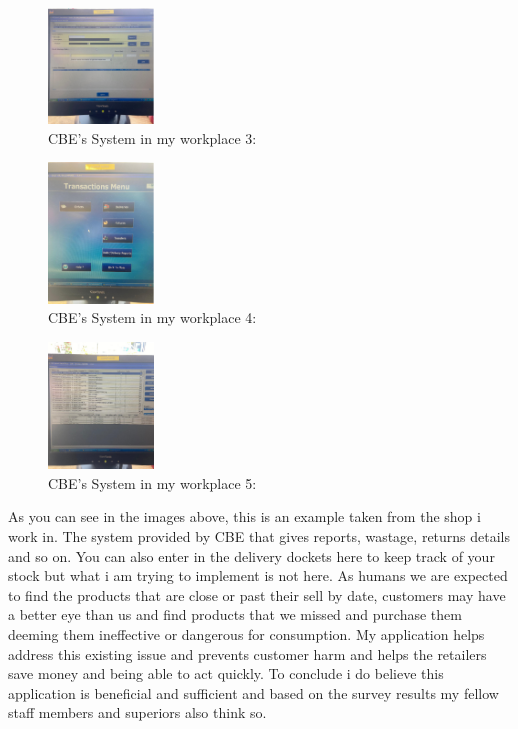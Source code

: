 \begin{figure}[h!]
	\caption{CBE's System in my workplace 3:}
	\label{image:mace3}
	\centering
	\includegraphics[width=0.25\textwidth]{images/mace3.PNG}
\end{figure}

\begin{figure}[h!]
	\caption{CBE's System in my workplace 4:}
	\label{image:mace4}
	\centering
	\includegraphics[width=0.25\textwidth]{images/mace4.PNG}
\end{figure}

\begin{figure}[h!]
	\caption{CBE's System in my workplace 5:}
	\label{image:mace5}
	\centering
	\includegraphics[width=0.25\textwidth]{images/mace5.PNG}
\end{figure}

As you can see in the images above, this is an example taken from the shop i work in. The system provided by CBE that gives reports, wastage, returns details and so on. You can also enter in the delivery dockets here to keep track of your stock but what i am trying to implement is not here. As humans we are expected to find the products that are close or past their sell by date, customers may have a better eye than us and find products that we missed and purchase them deeming them ineffective or dangerous for consumption. My application helps address this existing issue and prevents customer harm and helps the retailers save money and being able to act quickly. To conclude i do believe this application is beneficial and sufficient and based on the survey results my fellow staff members and superiors also think so. 


